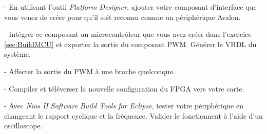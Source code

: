 - En utilisant l'outil \textit{Platform Designer}, ajouter votre composant d'interface que vous venez de créer pour qu'il soit reconnu comme un périphérique Avalon.

\medskip

- Intégrer ce composant au microcontrôleur que vous avez créer dans l’exercice \ref{sec:BuildMCU} et exporter la sortie du composant PWM. Générer le VHDL du système.

\medskip

- Affecter la sortie du PWM à une broche quelconque.

\medskip

- Compiler et téléverser la nouvelle configuration du FPGA vers votre carte.

\medskip

- Avec \textit{Nios II Software Build Tools for Eclipse}, tester votre périphérique en changeant le rapport cyclique et la fréquence. Valider le fonctionnent à l'aide d'un oscilloscope.